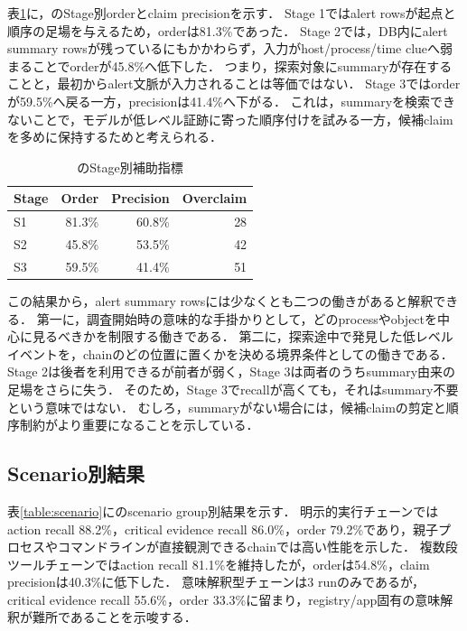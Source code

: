 表\ref{table:stageorder}に，のStage別orderとclaim precisionを示す．
Stage 1ではalert rowsが起点と順序の足場を与えるため，orderは81.3\%であった．
Stage 2では，DB内にalert summary rowsが残っているにもかかわらず，入力がhost/process/time clueへ弱まることでorderが45.8\%へ低下した．
つまり，探索対象にsummaryが存在することと，最初からalert文脈が入力されることは等価ではない．
Stage 3ではorderが59.5\%へ戻る一方，precisionは41.4\%へ下がる．
これは，summaryを検索できないことで，モデルが低レベル証跡に寄った順序付けを試みる一方，候補claimを多めに保持するためと考えられる．

\begin{table}[ht]
    \centering
    \caption{のStage別補助指標}
    \label{table:stageorder}
    \begin{tabular}{lrrr}
        \toprule
        Stage & Order & Precision & Overclaim \\
        \midrule
        S1 & 81.3\% & 60.8\% & 28 \\
        S2 & 45.8\% & 53.5\% & 42 \\
        S3 & 59.5\% & 41.4\% & 51 \\
        \bottomrule
    \end{tabular}
\end{table}

この結果から，alert summary rowsには少なくとも二つの働きがあると解釈できる．
第一に，調査開始時の意味的な手掛かりとして，どのprocessやobjectを中心に見るべきかを制限する働きである．
第二に，探索途中で発見した低レベルイベントを，chainのどの位置に置くかを決める境界条件としての働きである．
Stage 2は後者を利用できるが前者が弱く，Stage 3は両者のうちsummary由来の足場をさらに失う．
そのため，Stage 3でrecallが高くても，それはsummary不要という意味ではない．
むしろ，summaryがない場合には，候補claimの剪定と順序制約がより重要になることを示している．

\subsection{Scenario別結果}

表\ref{table:scenario}にのscenario group別結果を示す．
明示的実行チェーンではaction recall 88.2\%，critical evidence recall 86.0\%，order 79.2\%であり，親子プロセスやコマンドラインが直接観測できるchainでは高い性能を示した．
複数段ツールチェーンではaction recall 81.1\%を維持したが，orderは54.8\%，claim precisionは40.3\%に低下した．
意味解釈型チェーンは3 runのみであるが，critical evidence recall 55.6\%，order 33.3\%に留まり，registry/app固有の意味解釈が難所であることを示唆する．

